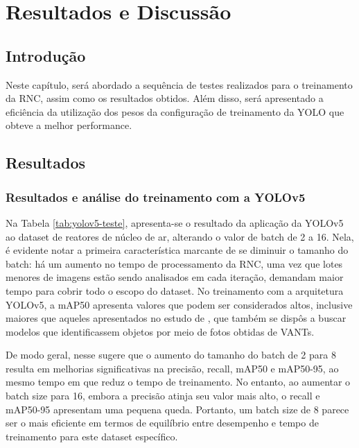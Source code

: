 \chapter{Resultados e Discussão}

\section{Introdução} 

Neste capítulo, será abordado a sequência de testes realizados para o treinamento da RNC, assim como os resultados obtidos. Além disso, será apresentado a eficiência da utilização dos pesos da configuração de treinamento da YOLO que obteve a melhor performance. 

\section{Resultados} 

\subsection{Resultados e análise do treinamento com a YOLOv5}

Na Tabela \ref{tab:yolov5-teste}, apresenta-se o resultado da aplicação da YOLOv5 ao dataset de reatores de núcleo de ar, alterando o valor de batch de 2 a 16. Nela, é evidente notar a primeira característica marcante de se diminuir o tamanho do batch: há um aumento no tempo de processamento da RNC, uma vez que lotes menores de imagens estão sendo analisados em cada iteração, demandam maior tempo para cobrir todo o escopo do dataset. No treinamento com a arquitetura YOLOv5, a mAP50 apresenta valores que podem ser considerados altos, inclusive maiores que aqueles apresentados no estudo de \cite{wang2023uav}, que também se dispôs a buscar modelos que identificassem objetos por meio de fotos obtidas de VANTs.

De modo geral, nesse sugere que o aumento do tamanho do batch de 2 para 8 resulta em melhorias significativas na precisão, recall, mAP50 e mAP50-95, ao mesmo tempo em que reduz o tempo de treinamento. No entanto, ao aumentar o batch size para 16, embora a precisão atinja seu valor mais alto, o recall e mAP50-95 apresentam uma pequena queda. Portanto, um batch size de 8 parece ser o mais eficiente em termos de equilíbrio entre desempenho e tempo de treinamento para este dataset específico.

